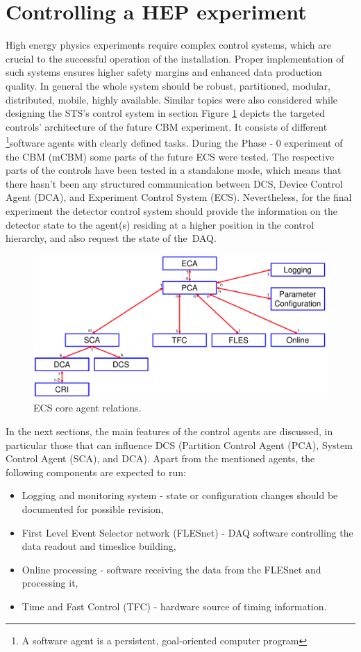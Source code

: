 \section{Controlling a HEP experiment}

High energy physics experiments require complex control systems, which are crucial to the successful operation of the installation. Proper implementation of such systems ensures higher safety margins and enhanced data production quality. In general the whole system should be robust, partitioned, modular, distributed, mobile, highly available. Similar topics were also considered while designing the \gls{STS}'s control system in section 
Figure \ref{fig_sim} depicts the targeted controls' architecture of the future \gls{CBM} experiment. It consists of different \footnote{A software agent is a persistent, goal-oriented computer program}{software agents} with clearly defined tasks. During the Phase - 0 experiment of the \gls{CBM} (\gls{mCBM}) some parts of the future \gls{ECS} were tested. The respective parts of the controls have been tested in a standalone mode, which means that there hasn't been any structured communication between \gls{DCS}, Device Control Agent (\gls{DCA}), and Experiment Control System (\gls{ECS}). Nevertheless, for the final experiment the detector control system should provide the information on the detector state to the agent(s) residing at a higher position in the control hierarchy, and also request the state of the~\gls{DAQ}.

\newpage
\begin{figure}[!h]
\centering
\includegraphics[width=0.8\columnwidth]{Chapter3/Controls/images/AgentsRelations_V2.pdf}
\caption{\gls{ECS} core agent relations.}
\label{fig_sim}
\end{figure}

 In the next sections, the main features of the control agents are discussed, in particular those that can influence \gls{DCS} (Partition Control Agent (\gls{PCA}), System Control Agent (\gls{SCA}), and \gls{DCA}). Apart from the mentioned agents, the following components are expected to run: 
 \begin{itemize}
     \item Logging and monitoring system - state or configuration changes should be documented for possible revision,
     \item First Level Event Selector network (FLESnet) - \gls{DAQ} software controlling the data readout and timeslice building,
     \item Online processing - software receiving the data from the FLESnet and processing it,
     \item Time and Fast Control (\gls{TFC}) - hardware source of timing information.
 \end{itemize}
